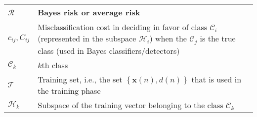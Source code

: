 \begin{xltabular}{\textwidth}{XX}
	\(\mathscr{R}\)                                                                                                                                                                & Bayes risk or average risk \cite{bishopPatternRecognitionMachine2006}                                                                                                                                                                                                                                                                  \\ \hline
	\(c_{ij}, C_{ij}\)                                                                                                                                                             & Misclassification cost in deciding in favor of class \(\mathscr{C}_i\) (represented in the subspace \(\mathscr{H}_i\)) when the \(\mathscr{C}_j\) is the true class (used in Bayes classifiers/detectors) \cite{bishopPatternRecognitionMachine2006,CharlesPES}                                                                        \\ \hline
	\(\mathscr{C}_k\)                                                                                                                                                              & \(k\)th class \cite{bishopPatternRecognitionMachine2006}                                                                                                                                                                                                                                                                               \\ \hline
	\(\mathscr{T}\)                                                                                                                                                                & Training set, i.e., the set \(\left\{ \mathbf{x}(n), d(n) \right\}\) that is used in the training phase \cite{bishopPatternRecognitionMachine2006}                                                                                                                                                                                     \\ \hline
	\(\mathscr{H}_k\)                                                                                                                                                              & Subspace of the training vector belonging to the class \(\mathscr{C}_k\)                                                                                                                                                                                                                                                               \\ \hline

\end{xltabular}
